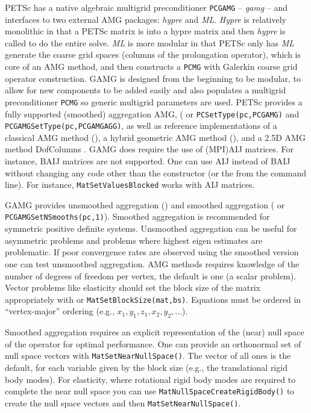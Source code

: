 PETSc has a native algebraic multigrid preconditioner \lstinline{PCGAMG} -- {\it gamg} -- and interfaces to two
external AMG packages: {\it hypre} and {\it ML}.
{\it Hypre}  is relatively monolithic in that a PETSc matrix is into a hypre matrix and then {\it hypre} is called to do the entire solve.
{\it ML} is more modular in that PETSc only has {\it ML} generate the coarse grid spaces (columns of the prolongation operator), which is core of an AMG method, and then constructs a \lstinline{PCMG} with Galerkin coarse grid operator construction. 
GAMG is designed from the beginning to be modular, to allow for new components to be added easily and also populates a multigrid preconditioner \lstinline{PCMG} so generic multigrid parameters are used.
PETSc provides a fully supported (smoothed) aggregation AMG, ( or  \lstinline{PCSetType(pc,PCGAMG)} and \lstinline{PCGAMGSetType(pc,PCGAMGAGG)}, as well as reference implementations of a classical AMG method (), a hybrid geometric AMG method (), and a 2.5D AMG method DofColumns \cite{IsaacStadlerGhattas2015}.
GAMG does require the use of (MPI)AIJ matrices.
For instance, BAIJ matrices are not supported.
One can use AIJ instead of BAIJ without changing any code other than the constructor (or the  from the command line).
For instance, \lstinline{MatSetValuesBlocked} works with AIJ matrices.

GAMG provides unsmoothed aggregation () and smoothed aggregation ( or \lstinline{PCGAMGSetNSmooths(pc,1)}).
Smoothed aggregation is recommended for symmetric positive definite
systems.
Unsmoothed aggregation can be useful for asymmetric
problems and problems where highest eigen estimates are problematic. 
If poor convergence rates are observed using the smoothed version one can test unsmoothed aggregation.
AMG methods requires knowledge of the number of degrees of
freedom per vertex, the default is one (a scalar problem).
Vector problems like elasticity should set the block size of the matrix appropriately with   or \lstinline{MatSetBlockSize(mat,bs)}.
Equations must be ordered in ``vertex-major'' ordering (e.g., $x_1,y_1,z_1,x_2,y_2,...$).

Smoothed aggregation requires an explicit representation of the (near) null space of the operator for optimal performance.
One can provide an orthonormal set of null space vectors with \lstinline{MatSetNearNullSpace()}.
The vector of all ones is the default, for each variable given by the block size (e.g., the translational rigid  body modes).
For elasticity, where rotational rigid body modes are required to complete the near null space you can use \lstinline{MatNullSpaceCreateRigidBody()} to create the null space vectors and then \lstinline{MatSetNearNullSpace()}.

